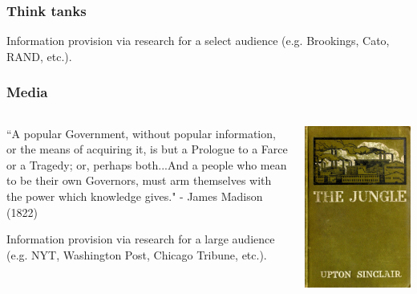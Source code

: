 \documentclass[aspectratio=169]{beamer}
\theoremstyle{principle}
\begin{document}
\begin{frame}
\frametitle{Think tanks}
Information provision via research for a select audience (e.g. Brookings, Cato, RAND, etc.).
\end{frame}

\begin{frame}
\frametitle{Media}
\begin{columns}

\begin{column}{0.5\textwidth}

``A popular Government, without popular information, or the means of acquiring it, is but a Prologue to a Farce or a Tragedy; or, perhaps both...And a people who mean to be their own Governors, must arm themselves with the power which knowledge gives." - James Madison (1822)\\
\bigskip

Information provision via research for a large audience (e.g. NYT, Washington Post, Chicago Tribune, etc.).
\end{column}
\begin{column}{0.5\textwidth}  %
    \begin{center}
     \includegraphics[scale=0.35]{jungle.png}
     \end{center}
\end{column}


\end{columns}
\end{frame}
\end{document}
